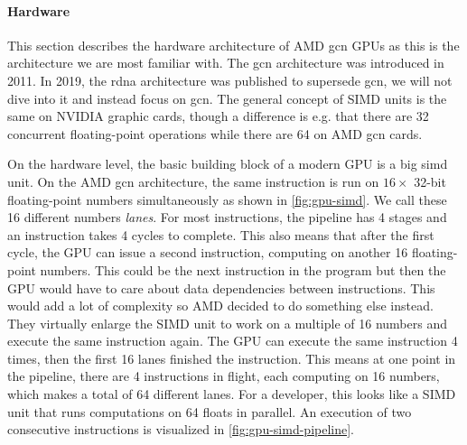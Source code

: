 \paragraph{Hardware} This section describes the hardware architecture of AMD \gls{gcn} GPUs as this is the architecture we are most familiar with.
The \gls{gcn} architecture was introduced in 2011.
In 2019, the \gls{rdna} architecture was published to supersede \gls{gcn}, we will not dive into it and instead focus on \gls{gcn}.
The general concept of SIMD units is the same on NVIDIA graphic cards, though a difference is e.g. that there are 32 concurrent floating-point operations while there are 64 on AMD \gls{gcn} cards.

\begin{figure}
\centering
\begin{minipage}[t]{.5\textwidth}
	\centering
	
\end{minipage}%
\begin{minipage}[t]{.5\textwidth}
	\centering
	
\end{minipage}
\end{figure}
On the hardware level, the basic building block of a modern GPU is a big \gls{simd} unit.
On the AMD \gls{gcn} architecture, the same instruction is run on $16 \times$ 32-bit floating-point numbers simultaneously as shown in \cref{fig:gpu-simd}. We call these 16 different numbers \emph{lanes}.
For most instructions, the pipeline has 4 stages and an instruction takes 4 cycles to complete.
This also means that after the first cycle, the GPU can issue a second instruction, computing on another 16 floating-point numbers. This could be the next instruction in the program but then the GPU would have to care about data dependencies between instructions. This would add a lot of complexity so AMD decided to do something else instead. They virtually enlarge the SIMD unit to work on a multiple of 16 numbers and execute the same instruction again.
The GPU can execute the same instruction 4 times, then the first 16 lanes finished the instruction. This means at one point in the pipeline, there are 4 instructions in flight, each computing on 16 numbers, which makes a total of 64 different lanes. For a developer, this looks like a SIMD unit that runs computations on 64 floats in parallel. An execution of two consecutive instructions is visualized in \cref{fig:gpu-simd-pipeline}.

